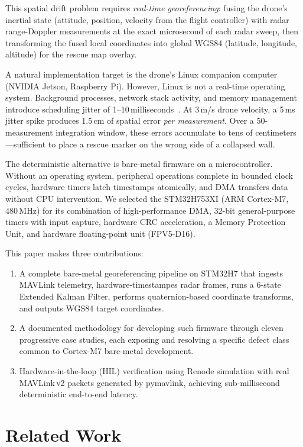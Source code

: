 \documentclass[conference,a4paper]{IEEEtran}
\begin{document}
This spatial drift problem requires \emph{real-time georeferencing}: fusing the drone's inertial state (attitude, position, velocity from the flight controller) with radar range-Doppler measurements at the exact microsecond of each radar sweep, then transforming the fused local coordinates into global WGS84 (latitude, longitude, altitude) for the rescue map overlay.

A natural implementation target is the drone's Linux companion computer (NVIDIA Jetson, Raspberry Pi). However, Linux is not a real-time operating system. Background processes, network stack activity, and memory management introduce scheduling jitter of 1--10\,milliseconds~\cite{barr2006}. At 3\,m/s drone velocity, a 5\,ms jitter spike produces 1.5\,cm of spatial error \emph{per measurement}. Over a 50-measurement integration window, these errors accumulate to tens of centimeters---sufficient to place a rescue marker on the wrong side of a collapsed wall.

The deterministic alternative is bare-metal firmware on a microcontroller. Without an operating system, peripheral operations complete in bounded clock cycles, hardware timers latch timestamps atomically, and DMA transfers data without CPU intervention. We selected the STM32H753XI (ARM Cortex-M7, 480\,MHz) for its combination of high-performance DMA, 32-bit general-purpose timers with input capture, hardware CRC acceleration, a Memory Protection Unit, and hardware floating-point unit (FPV5-D16).

This paper makes three contributions:
\begin{enumerate}
\item A complete bare-metal georeferencing pipeline on STM32H7 that ingests MAVLink telemetry, hardware-timestampes radar frames, runs a 6-state Extended Kalman Filter, performs quaternion-based coordinate transforms, and outputs WGS84 target coordinates.
\item A documented methodology for developing such firmware through eleven progressive case studies, each exposing and resolving a specific defect class common to Cortex-M7 bare-metal development.
\item Hardware-in-the-loop (HIL) verification using Renode simulation with real MAVLink\,v2 packets generated by pymavlink, achieving sub-millisecond deterministic end-to-end latency.
\end{enumerate}

\section{Related Work}
\label{sec:related}
\end{document}
